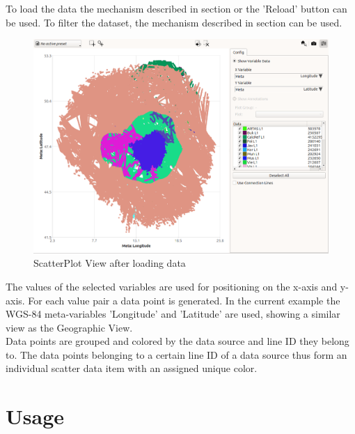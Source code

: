 To load the data the mechanism described in section  or the 'Reload' button can be used. To filter the dataset, the mechanism described in section  can be used. \\

\begin{figure}[H]
    \hspace*{-2cm}
    \includegraphics[width=18cm,frame]{figures/scatter_loaded.png}
  \caption{ScatterPlot View after loading data}
\end{figure}

The values of the selected variables are used for positioning on the x-axis and y-axis. For each value pair a data point is generated. 
In the current example the WGS-84 meta-variables 'Longitude' and 'Latitude' are used, showing a similar view as the Geographic View. \\

Data points are grouped and colored by the data source and line ID they belong to. 
The data points belonging to a certain line ID of a data source thus form an individual scatter data item with an assigned unique color.



\section{Usage}

